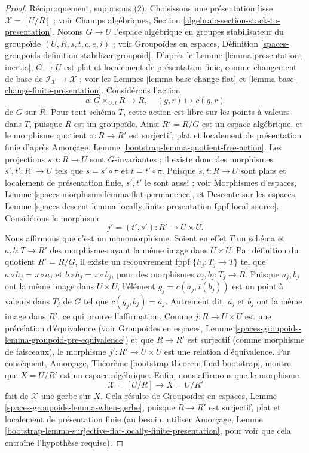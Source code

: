 \begin{proof}
\medskip\noindent
Réciproquement, supposons (2). Choisissons une présentation lisse
$\mathcal{X} = [U/R]$ ; voir Champs algébriques, Section
\ref{algebraic-section-stack-to-presentation}. Notons $G \to U$ l'espace
algébrique en groupes stabilisateur du groupoïde
$(U, R, s, t, c, e, i)$ ; voir Groupoïdes en espaces, Définition
\ref{spaces-groupoids-definition-stabilizer-groupoid}.
D'après le Lemme \ref{lemma-presentation-inertia}, $G \to U$ est plat et
localement de présentation finie, comme changement de base de
$\mathcal{I}_\mathcal{X} \to \mathcal{X}$ ; voir les
Lemmes \ref{lemma-base-change-flat} et
\ref{lemma-base-change-finite-presentation}. Considérons l'action
$$
a : G \times_{U, t} R \to R, \quad (g, r) \mapsto c(g, r)
$$
de $G$ sur $R$. Pour tout schéma $T$, cette action est libre sur les points à
valeurs dans $T$, puisque $R$ est un groupoïde. Ainsi $R' = R/G$ est un espace
algébrique, et le morphisme quotient $\pi : R \to R'$ est surjectif, plat et
localement de présentation finie d'après Amorçage, Lemme
\ref{bootstrap-lemma-quotient-free-action}. Les projections
$s, t : R \to U$ sont $G$-invariantes ; il existe donc des morphismes
$s' , t' : R' \to U$ tels que $s = s' \circ \pi$ et
$t = t' \circ \pi$. Puisque $s, t : R \to U$ sont plats et localement de
présentation finie, $s', t'$ le sont aussi ; voir Morphismes d'espaces, Lemme
\ref{spaces-morphisms-lemma-flat-permanence}, et Descente sur les espaces,
Lemme
\ref{spaces-descent-lemma-locally-finite-presentation-fppf-local-source}.
Considérons le morphisme
$$
j' = (t', s') : R' \longrightarrow U \times U.
$$
Nous affirmons que c'est un monomorphisme. Soient en effet $T$ un schéma et
$a, b : T \to R'$ des morphismes ayant la même image dans $U \times U$. Par
définition du quotient $R' = R/G$, il existe un recouvrement fppf
$\{h_j : T_j \to T\}$ tel que
$a \circ h_j = \pi \circ a_j$ et $b \circ h_j = \pi \circ b_j$, pour des
morphismes $a_j, b_j : T_j \to R$. Puisque $a_j, b_j$ ont la même image dans
$U \times U$, l'élément $g_j = c(a_j, i(b_j))$ est un point à valeurs dans
$T_j$ de $G$ tel que $c(g_j, b_j) = a_j$. Autrement dit, $a_j$ et $b_j$ ont la
même image dans $R'$, ce qui prouve l'affirmation. Comme
$j : R \to U \times U$ est une prérelation d'équivalence (voir Groupoïdes en
espaces, Lemme
\ref{spaces-groupoids-lemma-groupoid-pre-equivalence})
et que $R \to R'$ est surjectif (comme morphisme de faisceaux), le morphisme
$j' : R' \to U \times U$ est une relation d'équivalence. Par conséquent,
Amorçage, Théorème \ref{bootstrap-theorem-final-bootstrap}, montre que
$X = U/R'$ est un espace algébrique. Enfin, nous affirmons que le morphisme
$$
\mathcal{X} = [U/R] \longrightarrow X = U/R'
$$
fait de $\mathcal{X}$ une gerbe sur $X$. Cela résulte de Groupoïdes
en espaces, Lemme \ref{spaces-groupoids-lemma-when-gerbe}, puisque
$R \to R'$ est surjectif, plat et localement de présentation finie (au besoin,
utiliser Amorçage, Lemme
\ref{bootstrap-lemma-surjective-flat-locally-finite-presentation}, pour voir
que cela entraîne l'hypothèse requise).
\end{proof}

